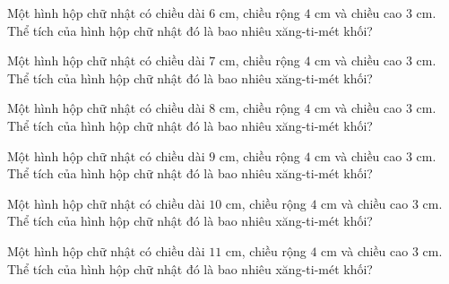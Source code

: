 
\begin{ex}
  Một hình hộp chữ nhật có chiều dài $6\text{ cm}$, chiều rộng $4\text{ cm}$ và chiều cao $3\text{ cm}$. Thể tích của hình hộp chữ nhật đó là bao nhiêu xăng-ti-mét khối?
\end{ex}

\begin{ex}
  Một hình hộp chữ nhật có chiều dài $7\text{ cm}$, chiều rộng $4\text{ cm}$ và chiều cao $3\text{ cm}$. Thể tích của hình hộp chữ nhật đó là bao nhiêu xăng-ti-mét khối?
\end{ex}

\begin{ex}
  Một hình hộp chữ nhật có chiều dài $8\text{ cm}$, chiều rộng $4\text{ cm}$ và chiều cao $3\text{ cm}$. Thể tích của hình hộp chữ nhật đó là bao nhiêu xăng-ti-mét khối?
\end{ex}

\begin{ex}
  Một hình hộp chữ nhật có chiều dài $9\text{ cm}$, chiều rộng $4\text{ cm}$ và chiều cao $3\text{ cm}$. Thể tích của hình hộp chữ nhật đó là bao nhiêu xăng-ti-mét khối?
\end{ex}

\begin{ex}
  Một hình hộp chữ nhật có chiều dài $10\text{ cm}$, chiều rộng $4\text{ cm}$ và chiều cao $3\text{ cm}$. Thể tích của hình hộp chữ nhật đó là bao nhiêu xăng-ti-mét khối?
\end{ex}

\begin{ex}
  Một hình hộp chữ nhật có chiều dài $11\text{ cm}$, chiều rộng $4\text{ cm}$ và chiều cao $3\text{ cm}$. Thể tích của hình hộp chữ nhật đó là bao nhiêu xăng-ti-mét khối?
\end{ex}

